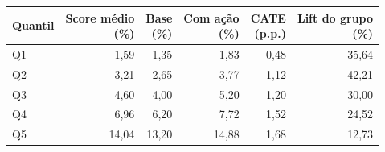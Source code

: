 \begin{tabular}{lrrrrr}
\toprule
Quantil & \shortstack{Score médio\\(\%)} & \shortstack{Base\\(\%)} & \shortstack{Com ação\\(\%)} & \shortstack{CATE\\(p.p.)} & \shortstack{Lift do grupo\\(\%)} \\
\midrule
Q1 & 1,59 & 1,35 & 1,83 & 0,48 & 35,64 \\
Q2 & 3,21 & 2,65 & 3,77 & 1,12 & 42,21 \\
Q3 & 4,60 & 4,00 & 5,20 & 1,20 & 30,00 \\
Q4 & 6,96 & 6,20 & 7,72 & 1,52 & 24,52 \\
Q5 & 14,04 & 13,20 & 14,88 & 1,68 & 12,73 \\
\bottomrule
\end{tabular}
